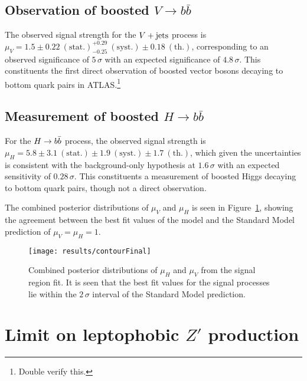 \subsection{Observation of boosted $V\to b\bar{b}$}

The observed signal strength for the $V + \text{jets}$ process is\\ $\mu_{V} = 1.5 \pm 0.22~\mathrm{(stat.)}^{+0.29}_{-0.25}~\mathrm{(syst.)} \pm 0.18~\mathrm{(th.)}$, corresponding to an observed significance of $5\,\sigma$ with an expected significance of $4.8\,\sigma$.
This constituents the first direct observation of boosted vector bosons decaying to bottom quark pairs in ATLAS.\footnote{Double verify this.}

\subsection{Measurement of boosted $H\to b\bar{b}$}
For the $H \to b\bar{b}$ process, the observed signal strength is\\ $\mu_{H} = 5.8 \pm 3.1~\mathrm{(stat.)} \pm 1.9~\mathrm{(syst.)} \pm 1.7~\mathrm{(th.)}$, which given the uncertainties is consistent with the background-only hypothesis at $1.6\,\sigma$ with an expected sensitivity of $0.28\,\sigma$.
This constituents a measurement of boosted Higgs decaying to bottom quark pairs, though not a direct observation.

The combined posterior distributions of $\mu_{V}$ and $\mu_{H}$ is seen in Figure~\ref{fig:signal_strength_contour}, showing the agreement between the best fit values of the model and the Standard Model prediction of $\mu_{V} = \mu_{H} = 1$.

\begin{figure}[htbp]
 \centering
 \texttt{[image: results/contourFinal]}
 \caption{Combined posterior distributions of $\mu_{H}$ and $\mu_{V}$ from the signal region fit.
  It is seen that the best fit values for the signal processes lie within the $2\,\sigma$ interval of the Standard Model prediction.}
 \label{fig:signal_strength_contour}
\end{figure}

\section{Limit on leptophobic $Z'$ production}
